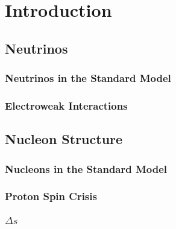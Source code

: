 \section{Introduction} \label{intro}
\hspace{\parindent}

\subsection{Neutrinos}\label{nutheory}
  \subsubsection{Neutrinos in the Standard Model}
  \subsubsection{Electroweak Interactions}

\subsection{Nucleon Structure}\label{nucleon}
  \subsubsection{Nucleons in the Standard Model}
  \subsubsection{Proton Spin Crisis}
  \subsubsection{$\Delta s$}

